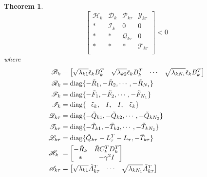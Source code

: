 \documentclass[journal,final,twocolumn]{IEEEtran}
\newtheorem{theorem}{Theorem}
\begin{document}
\begin{theorem}
	\begin{equation}\label{T3C3}
		\begin{bmatrix}
			\mathscr{H}_{k}&\mathscr{D}_{k}&\mathscr{P}_{k\tau }&\mathscr{Y}_{k\tau }\\
			*&\mathscr{I}_{k}&0&0\\
			*&*&\mathscr{Q}_{k\tau }&0\\
			*&*&*&\mathscr{T}_{k\tau }\\
		\end{bmatrix} <0
	\end{equation}
	where 
	\begin{equation}\notag
		\begin{split}
			\mathscr{B}_{k}&= \begin{bmatrix}
				\sqrt{\lambda_{k1}}\tilde{\epsilon}_{k}B^{T}_{k}&\sqrt{\lambda_{k2}}\tilde{\epsilon}_{k}B^{T}_{k}&\cdots&\sqrt{\lambda_{kN_{1}}}\tilde{\epsilon}_{k}B^{T}_{k}
			\end{bmatrix}\\
			\mathscr{R}_{k}&= \mathrm{diag}\{-\tilde{R}_{1}, -\tilde{R}_{2}, \cdots, -\tilde{R}_{N_{1}} \} \\
			\mathscr{F}_{k}&= \mathrm{diag}\{-\tilde{F}_{1}, -\tilde{F}_{2}, \cdots, -\tilde{F}_{N_{1}} \} \\	
			\mathscr{I}_{k} &= \mathrm{diag}\{-\tilde{\epsilon}_{k}, -I, -I, -\tilde{\epsilon}_{k} \}\\	
			\mathscr{Q}_{k\tau }&= \mathrm{diag}\{-\tilde{Q}_{k1}, -\tilde{Q}_{k2}, \cdots, -\tilde{Q}_{kN_{2}} \}\\
			\mathscr{T}_{k\tau }&= \mathrm{diag}\{-\tilde{T}_{k1}, -\tilde{T}_{k2}, \cdots, -\tilde{T}_{kN_{2}} \}\\
			\mathscr{L}_{k\tau }&= \mathrm{diag}\{\tilde{Q}_{k\tau }-L^{T}_{\tau }-L_{\tau },  -\tilde{T}_{k\tau } \}\\
			\mathscr{H}_{k}\ &= \begin{bmatrix}
				-\tilde{R}_{k} & \tilde{R}C^{T}_{k}D^{T}_{k}\\
				*& -\gamma^{2}I
			\end{bmatrix} \\
			\mathscr{A}_{k\tau } &=\begin{bmatrix}
				\sqrt{\lambda_{k1}} \tilde{A}^{T}_{k\tau }& \cdots&\sqrt{\lambda_{kN_{1}}} \tilde{A}^{T}_{k\tau }\\

\end{bmatrix}
\end{split}
\end{equation}
\end{theorem}
\end{document}
